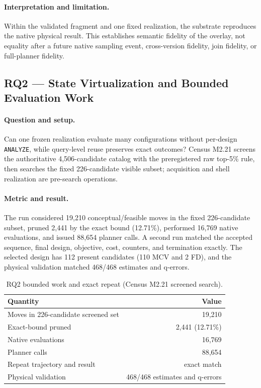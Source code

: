 \paragraph{Interpretation and limitation.}
Within the validated fragment and one fixed realization, the substrate
reproduces the native physical result.  This establishes semantic fidelity of
the overlay, not equality after a future native sampling event, cross-version
fidelity, join fidelity, or full-planner fidelity.

\subsection{RQ2 --- State Virtualization and Bounded Evaluation Work}

\paragraph{Question and setup.}
Can one frozen realization evaluate many configurations without per-design
\texttt{ANALYZE}, while query-level reuse preserves exact outcomes?  Census
M2.21 screens the authoritative 4,506-candidate catalog with the
preregistered raw top-5\% rule, then searches the fixed 226-candidate visible
subset; acquisition and shell realization are pre-search operations.

\paragraph{Metric and result.}
The run considered 19,210 conceptual/feasible moves in the fixed
226-candidate subset, pruned 2,441 by the exact bound (12.71\%), performed
16,769 native evaluations, and issued 88,654 planner calls.  A second run
matched the
accepted sequence, final design, objective, cost, counters, and termination
exactly.  The selected design has 112 present candidates (110 MCV and 2 FD),
and the physical validation matched 468/468 estimates and q-errors.

\begin{table}[t]
\caption{RQ2 bounded work and exact repeat (Census M2.21 screened search).}
\label{tab:rq2}
\scriptsize
\begin{tabular}{@{}p{}r@{}}
\toprule
Quantity & Value \\
\midrule
Moves in 226-candidate screened set & 19,210 \\
Exact-bound pruned & 2,441 (12.71\%) \\
Native evaluations & 16,769 \\
Planner calls & 88,654 \\
Repeat trajectory and result & exact match \\
Physical validation & 468/468 estimates and q-errors \\
\bottomrule
\end{tabular}
\end{table}

